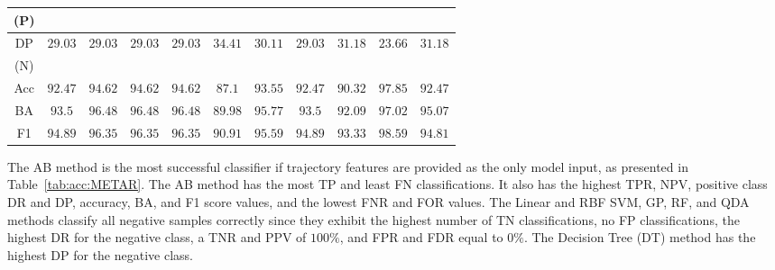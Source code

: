 \let\LaTeXcline\cline\documentclass[sn-mathphys-num]{sn-jnl}\let\cline\LaTeXcline
\begin{document}
\begin{table}[!ht]
\begin{tabular}{|c|c|c|c|c|c|c|c|c|c|c|}
        (P) & & & & & & & & & & \\ \hline
        DP & \multirow{2}{*}{$29.03$} & \multirow{2}{*}{$29.03$} & \multirow{2}{*}{$29.03$} & \multirow{2}{*}{$29.03$} & \multirow{2}{*}{$\mathbf{34.41}$} & \multirow{2}{*}{$30.11$} & \multirow{2}{*}{$29.03$} & \multirow{2}{*}{$31.18$} & \multirow{2}{*}{$23.66$} & \multirow{2}{*}{$31.18$} \\
        (N) & & & & & & & & & & \\ \hline
        Acc & $92.47$ & $94.62$ & $94.62$ & $94.62$ & $87.1$ & $93.55$ & $92.47$ & $90.32$ & $\mathbf{97.85}$ & $92.47$ \\ \hline
        BA & $93.5$ & $96.48$ & $96.48$ & $96.48$ & $89.98$ & $95.77$ & $93.5$ & $92.09$ & $\mathbf{97.02}$ & $95.07$ \\ \hline
        F1 & $94.89$ & $96.35$ & $96.35$ & $96.35$ & $90.91$ & $95.59$ & $94.89$ & $93.33$ & $\mathbf{98.59}$ & $94.81$ \\ \hline
	\end{tabular}
\end{table}
        
The AB method is the most successful classifier if trajectory features are provided as the only model input, as presented in Table~\ref{tab:acc:METAR}. The AB method has the most TP and least FN classifications. It also has the highest TPR, NPV, positive class DR and DP, accuracy, BA, and F1 score values, and the lowest FNR and FOR values. The Linear and RBF SVM, GP, RF, and QDA methods classify all negative samples correctly since they exhibit the highest number of TN classifications, no FP classifications, the highest DR for the negative class, a TNR and PPV of $100\%$, and FPR and FDR equal to $0\%$. The Decision Tree (DT) method has the highest DP for the negative class.
\end{document}
